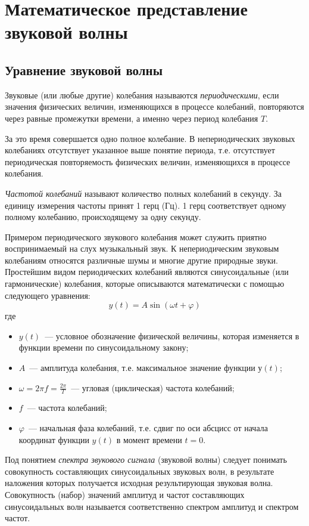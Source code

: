 \documentclass[oneside, final, 14pt]{extreport}
\begin{document}
\section{Математическое представление звуковой волны}
\subsection{Уравнение звуковой волны}
Звуковые (или любые другие) колебания называются {\itshape периодическими}, если значения физических величин, изменяющихся в процессе колебаний, повторяются через равные промежутки времени, а именно через период колебания \(T\).

За это время совершается одно полное колебание. В непериодических звуковых колебаниях отсутствует указанное выше понятие периода, т.е. отсутствует периодическая повторяемость физических величин, изменяющихся в процессе колебания.

{\itshape Частотой колебаний} называют количество полных колебаний в секунду. За единицу измерения частоты принят 1 герц (Гц). 1 герц соответствует одному полному колебанию, происходящему за одну секунду.

Примером периодического звукового колебания может служить приятно воспринимаемый на слух музыкальный звук. К непериодическим звуковым колебаниям относятся различные шумы и многие другие природные звуки. Простейшим видом периодических колебаний являются синусоидальные (или гармонические) колебания, которые описываются математически с помощью следующего уравнения:
\[y(t)=A\sin(\omega t+\varphi)\]
где
\begin{itemize}
\item \(y(t)\)~--- условное обозначение физической величины, которая изменяется в функции времени по синусоидальному закону;
\item \(A\)~--- амплитуда колебания, т.е. максимальное значение функции \(у(t)\);
\item \(\omega=2\pi f=\frac{2\pi}{T}\)~--- угловая (циклическая) частота колебаний;
\item \(f\)~--- частота колебаний;
\item \(\varphi\)~--- начальная фаза колебаний, т.е. сдвиг по оси абсцисс от начала координат функции \(y(t)\) в момент времени \(t=0\).
\end{itemize}

Под понятием {\itshape спектра звукового сигнала} (звуковой волны) следует понимать совокупность составляющих синусоидальных звуковых волн, в результате наложения которых получается исходная результирующая звуковая волна. Совокупность (набор) значений амплитуд и частот составляющих синусоидальных волн называется соответственно спектром амплитуд и спектром частот.
\end{document}
